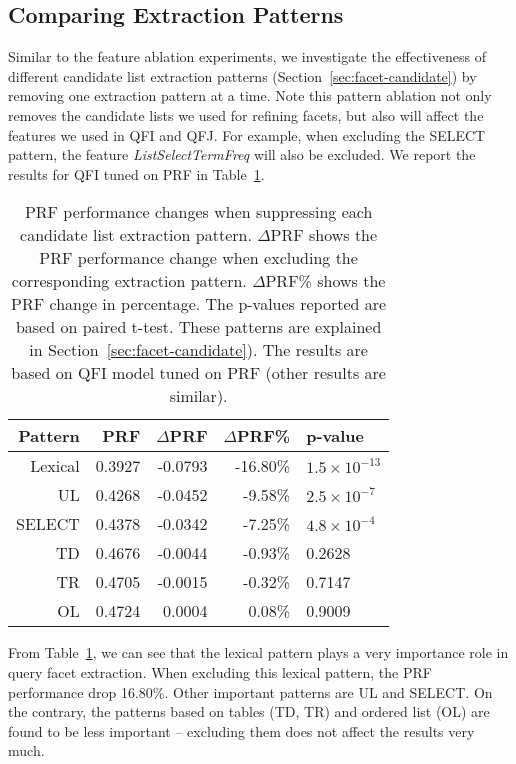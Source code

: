 \subsection{Comparing Extraction Patterns} \label{sec:intrinsic-patterns}
Similar to the feature ablation experiments, we investigate the effectiveness of different candidate list extraction patterns (Section~\ref{sec:facet-candidate}) by removing one extraction pattern at a time. Note this pattern ablation not only removes the candidate lists we used for refining facets, but also will affect the features we used in QFI and QFJ. For example, when excluding the SELECT pattern, the feature \textit{ListSelectTermFreq} will also be excluded. We report the results for QFI tuned on PRF in Table~\ref{tab:intrinsic-clists}.
\begin{table}[H]
\centering
\caption{PRF performance changes when suppressing each candidate list extraction pattern. $\Delta$PRF shows the PRF performance change when excluding the corresponding extraction pattern. $\Delta$PRF\% shows the PRF change in percentage. The p-values reported are based on paired t-test. These patterns are explained in Section~\ref{sec:facet-candidate}). The results are based on QFI model tuned on PRF (other results are similar).}
\label{tab:intrinsic-clists}
\begin{tabular}{|r|r|r|r|l|} \hline
Pattern & PRF & $\Delta$PRF & $\Delta$PRF\% & p-value\\ \hline
Lexical & 0.3927 & -0.0793 & -16.80\% & $1.5\times10^{-13}$ \\ \hline
UL & 0.4268 & -0.0452 & -9.58\% & $2.5\times10^{-7}$ \\ \hline
SELECT & 0.4378 & -0.0342 & -7.25\% & $4.8\times10^{-4}$ \\ \hline
TD & 0.4676 & -0.0044 & -0.93\% & 0.2628 \\ \hline
TR & 0.4705 & -0.0015 & -0.32\% & 0.7147 \\ \hline
OL & 0.4724 & 0.0004 & 0.08\% & 0.9009 \\ \hline
\end{tabular}
\end{table}
From Table~\ref{tab:intrinsic-clists}, we can see that the lexical pattern plays a very importance role in query facet extraction. When excluding this lexical pattern, the PRF performance drop 16.80\%. Other important patterns are UL and SELECT. On the contrary, the patterns based on tables (TD, TR) and ordered list (OL) are found to be less important -- excluding them does not affect the results very much.

